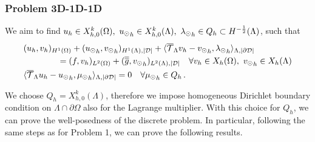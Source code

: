 
\subsubsection{Problem 3D-1D-1D}
We aim to find  $u_h \in X_{h,0}^k(\Omega) ,\ {u_{\odot}}_h \in X_{h,0}^k(\Lambda), \ {\lambda_{\odot}}_h \in Q_h \subset H^{-\frac12}(\Lambda)$, such that
\begin{subequations}
\begin{align}\label{eq:prob2_discrete}
&(u_h,v_h)_{H^1(\Omega)} + ({\ud}_h,{\vd}_h)_{H^1(\Lambda), |{\cal D}|} 
+  \langle  \mtrace v_h -  {\vd}_h, {\ld}_h \rangle_{\Lambda, |\DD|} 
\\
\nonumber
&\qquad\qquad= (f,v_h)_{L^2(\Omega)} + (\avrd{g},{\vd}_h)_{L^2(\Lambda), |{\cal D}|}
\quad \forall v_h \in X_h(\Omega), \ {\vd}_h \in X_h(\Lambda)
\\
&  \langle \mtrace u_h - {\ud}_h, {\md}_h \rangle_{\Lambda,| \DD| } = 0
\quad \forall {\md}_h \in Q_h\,.
\end{align}
\end{subequations}

We choose $Q_h=X_{h,0}^k(\Lambda)$, therefore we impose homogeneous Dirichlet boundary condition on $\Lambda \cap \partial \Omega$ also for the Lagrange multiplier. With this choice for $Q_h$, we can prove the well-posedness of the discrete problem. In particular, following the same steps as for Problem 1, we can prove the following results.

